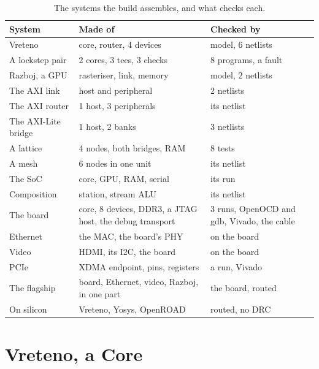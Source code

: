 \documentclass[journal,9pt]{IEEEtran}
\begin{document}
\begin{table}[htbp]
\caption{The systems the build assembles, and what checks each.}
\label{tab:w-systems}
\centering\footnotesize
\begin{tabular}{@{}p{}p{}p{}@{}}
\toprule
System & Made of & Checked by \\
\midrule
Vreteno & core, router, 4 devices & model, 6 netlists \\
A lockstep pair & 2 cores, 3 tees, 3 checks & 8 programs, a fault \\
Razboj, a GPU & rasteriser, link, memory & model, 2 netlists \\
The AXI link & host and peripheral & 2 netlists \\
The AXI router & 1 host, 3 peripherals & its netlist \\
The AXI-Lite bridge & 1 host, 2 banks & 3 netlists \\
A lattice & 4 nodes, both bridges, RAM & 8 tests \\
A mesh & 6 nodes in one unit & its netlist \\
The SoC & core, GPU, RAM, serial & its run \\
Composition & station, stream ALU & its netlist \\
The board & core, 8 devices, DDR3, a JTAG host, the debug transport & 3 runs, OpenOCD and gdb, Vivado, the cable \\
Ethernet & the MAC, the board's PHY & on the board \\
Video & HDMI, its I2C, the board & on the board \\
PCIe & XDMA endpoint, pins, registers & a run, Vivado \\
The flagship & board, Ethernet, video, Razboj, in one part & the board, routed \\
On silicon & Vreteno, Yosys, OpenROAD & routed, no DRC \\
\bottomrule
\end{tabular}
\end{table}

\section{Vreteno, a Core}
\end{document}
